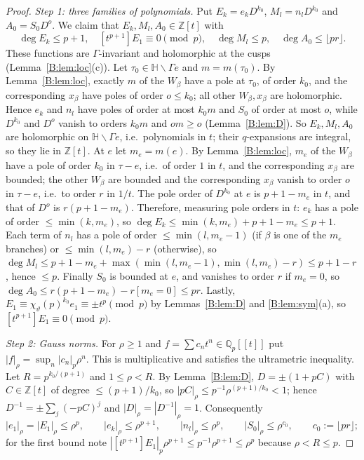\documentclass[11pt,a4paper]{article}
\theoremstyle{definition}\newtheorem{definition}[theorem]{Definition}
\theoremstyle{remark}\newtheorem{remark}[theorem]{Remark}
\newcommand{\Z}{\mathbb Z}
\newcommand{\Q}{\mathbb Q}
\newcommand{\Hb}{\mathbb H}
\numberwithin{equation}{section}
\begin{document}
\begin{proof}
\emph{Step 1: three families of polynomials.} Put $E_k=e_kD^{k_0}$, $M_l=n_lD^{k_0}$ and $A_0=S_0D^{o}$. We claim that
$E_k,M_l,A_0\in\Z[t]$ with
\[
\deg E_k\le p+1,\quad [t^{p+1}]E_1\equiv0\pmod p,\quad \deg M_l\le p,\quad \deg A_0\le\lfloor pr\rfloor .
\]
These functions are $\Gamma$-invariant and holomorphic at the cusps (Lemma~\ref{B:lem:loc}(c)). Let
$\tau_0\in\Hb\smallsetminus\Gamma e$ and $m=m(\tau_0)$. By Lemma~\ref{B:lem:loc}, exactly $m$ of the $W_\beta$ have a pole
at $\tau_0$, of order $k_0$, and the corresponding $x_\beta$ have poles of order $o\le k_0$; all other $W_\beta,x_\beta$ are
holomorphic. Hence $e_k$ and $n_l$ have poles of order at most $k_0m$ and $S_0$ of order at most $o$, while $D^{k_0}$
and $D^{o}$ vanish to orders $k_0m$ and $om\ge o$ (Lemma~\ref{B:lem:D}). So $E_k,M_l,A_0$ are holomorphic on
$\Hb\smallsetminus\Gamma e$, i.e.\ polynomials in $t$; their $q$-expansions are integral, so they lie in $\Z[t]$.
At $e$ let $m_e=m(e)$. By Lemma~\ref{B:lem:loc}, $m_e$ of the $W_\beta$ have a pole of order $k_0$ in $\tau-e$, i.e.\ of
order $1$ in $t$, and the corresponding $x_\beta$ are bounded; the other $W_\beta$ are bounded and the corresponding $x_\beta$
vanish to order $o$ in $\tau-e$, i.e.\ to order $r$ in $1/t$. The pole order of $D^{k_0}$ at $e$ is $p+1-m_e$ in $t$, and that
of $D^o$ is $r(p+1-m_e)$. Therefore, measuring pole orders in $t$:
$e_k$ has a pole of order $\le\min(k,m_e)$, so $\deg E_k\le\min(k,m_e)+p+1-m_e\le p+1$. Each term of $n_l$ has a pole of
order $\le\min(l,m_e-1)$ (if $\beta$ is one of the $m_e$ branches) or $\le\min(l,m_e)-r$ (otherwise), so
$\deg M_l\le p+1-m_e+\max(\min(l,m_e-1),\min(l,m_e)-r)\le p+1-r$, hence $\le p$. Finally $S_0$ is bounded at $e$, and vanishes
to order $r$ if $m_e=0$, so $\deg A_0\le r(p+1-m_e)-r[m_e=0]\le pr$. Lastly, $E_1\equiv\chi_\vartheta(p)^{k_0}e_1\equiv\pm t^p
\pmod p$ by Lemmas~\ref{B:lem:D} and \ref{B:lem:sym}(a), so $[t^{p+1}]E_1\equiv0\pmod p$.

\emph{Step 2: Gauss norms.} For $\rho\ge1$ and $f=\sum c_nt^n\in\Q_p[[t]]$ put $|f|_\rho=\sup_n|c_n|_p\rho^n$. This is
multiplicative and satisfies the ultrametric inequality. Let $R=p^{k_0/(p+1)}$ and $1\le\rho<R$. By
Lemma~\ref{B:lem:D}, $D=\pm(1+pC)$ with $C\in\Z[t]$ of degree $\le(p+1)/k_0$, so
$|pC|_\rho\le p^{-1}\rho^{(p+1)/k_0}<1$; hence $D^{-1}=\pm\sum_j(-pC)^j$ and $|D|_\rho=|D^{-1}|_\rho=1$. Consequently
\[
|e_1|_\rho=|E_1|_\rho\le\rho^p,\qquad |e_k|_\rho\le\rho^{p+1},\qquad|n_l|_\rho\le\rho^p,\qquad |S_0|_\rho\le\rho^{c_0},
\qquad c_0:=\lfloor pr\rfloor;
\]
for the first bound note $|[t^{p+1}]E_1|_p\rho^{p+1}\le p^{-1}\rho^{p+1}\le\rho^p$ because $\rho<R\le p$.


\end{proof}
\end{document}
